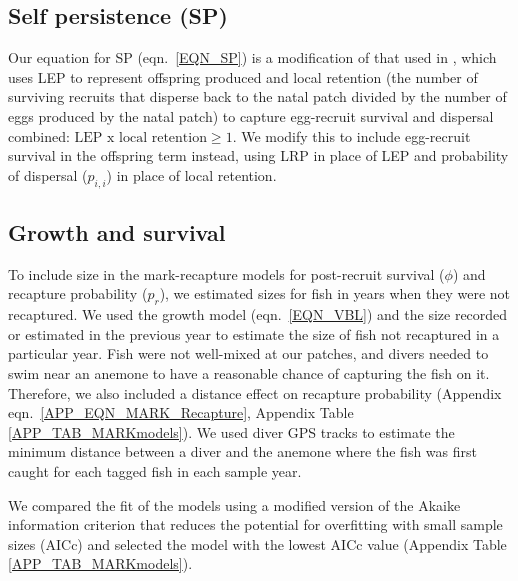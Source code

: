 \documentclass[12pt, oneside]{article}   	%
\begin{document}
\subsection{Self persistence (SP)} \label{APP_SEC_METHODS_SP}

Our equation for SP (eqn.\ \ref{EQN_SP}) is a modification of that used in \cite{burgess2014beyond}, which uses LEP to represent offspring produced and local retention (the number of surviving recruits that disperse back to the natal patch divided by the number of eggs produced by the natal patch) to capture egg-recruit survival and dispersal combined: $\text{LEP } \text{x } \text{local retention} \geq 1$. We modify this to include egg-recruit survival in the offspring term instead, using LRP in place of LEP and probability of dispersal ($p_{i,i}$) in place of local retention.
 

\subsection{Growth and survival} \label{APP_SEC_METHODS_Growth_and_survival}

To include size in the mark-recapture models for post-recruit survival ($\phi$) and recapture probability ($p_r$), we estimated sizes for fish in years when they were not recaptured. We used the growth model (eqn.\ \ref{EQN_VBL}) and the size recorded or estimated in the previous year to estimate the size of fish not recaptured in a particular year. Fish were not well-mixed at our patches, and divers needed to swim near an anemone to have a reasonable chance of capturing the fish on it. Therefore, we also included a distance effect on recapture probability (Appendix eqn.\ \ref{APP_EQN_MARK_Recapture}, Appendix Table \ref{APP_TAB_MARKmodels}). We used diver GPS tracks to estimate the minimum distance between a diver and the anemone where the fish was first caught for each tagged fish in each sample year.

We compared the fit of the models using a modified version of the Akaike information criterion that reduces the potential for overfitting with small sample sizes (AICc) and selected the model with the lowest AICc value (Appendix Table \ref{APP_TAB_MARKmodels}).

\end{document}
